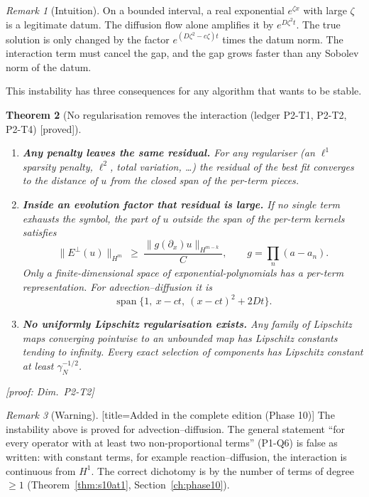 \documentclass[11pt]{article}
\theoremstyle{plain}
\newtheorem{theorem}{Theorem}[section]
\theoremstyle{definition}
\theoremstyle{remark}
\newtheorem{remark}[theorem]{Remark}
\DeclareMathOperator{\spn}{span}
\newcommand{\badge}[2]{\textcolor{#1}{\textsf{\footnotesize[#2]}}}
\newcommand{\proved}[1][]{\badge{cC}{proved#1}}
\newcommand{\led}[1]{\textcolor{cG}{\textsf{\footnotesize(ledger #1)}}}
\newenvironment{intuition}{\begin{remark}[Intuition]}{\end{remark}}
\newenvironment{caution}{\begin{remark}[Warning]}{\end{remark}}
\newcommand{\dimref}[1]{\textsf{\footnotesize[proof: Dim.~#1]}}
\begin{document}
\begin{intuition}
On a bounded interval, a real exponential $e^{\zeta x}$ with large $\zeta$ is a legitimate datum. The diffusion flow alone amplifies it by $e^{D\zeta^2t}$. The true solution is only changed by the factor $e^{(D\zeta^2-c\zeta)t}$ times the datum norm. The interaction term must cancel the gap, and the gap grows faster than any Sobolev norm of the datum.
\end{intuition}

This instability has three consequences for any algorithm that wants to be stable.

\begin{theorem}[{No regularisation removes the interaction \led{P2-T1, P2-T2, P2-T4} \proved}]\label{f:thm:noreg}
\begin{enumerate}[label=(\alph*)]
\item \textbf{Any penalty leaves the same residual.} For any regulariser (an $\ell^1$ sparsity penalty, $\ell^2$, total variation, \dots) the residual of the best fit converges to the distance of $u$ from the closed span of the per-term pieces.
\item \textbf{Inside an evolution factor that residual is large.} If no single term exhausts the symbol, the part of $u$ outside the span of the per-term kernels satisfies
\[
\|E^\perp(u)\|_{H^m}\ \ge\ \frac{\|g(\partial_x)u\|_{H^{m-k}}}{C},\qquad g=\prod_n(a-a_n).
\]
Only a finite-dimensional space of exponential-polynomials has a per-term representation. For advection--diffusion it is
\[
\spn\{1,\ x-ct,\ (x-ct)^2+2Dt\}.
\]
\item \textbf{No uniformly Lipschitz regularisation exists.} Any family of Lipschitz maps converging pointwise to an unbounded map has Lipschitz constants tending to infinity. Every exact selection of components has Lipschitz constant at least $\gamma_N^{-1/2}$.
\end{enumerate}
\dimref{P2-T2}
\end{theorem}

\begin{caution}[title=Added in the complete edition (Phase 10)]
The instability above is proved for advection--diffusion. The general statement ``for every operator with at least two non-proportional terms'' (P1-Q6) is false as written: with constant terms, for example reaction--diffusion, the interaction is continuous from $H^1$. The correct dichotomy is by the number of terms of degree $\ge1$ (Theorem~\ref{thm:s10at1}, Section~\ref{ch:phase10}).
\end{caution}
\end{document}
